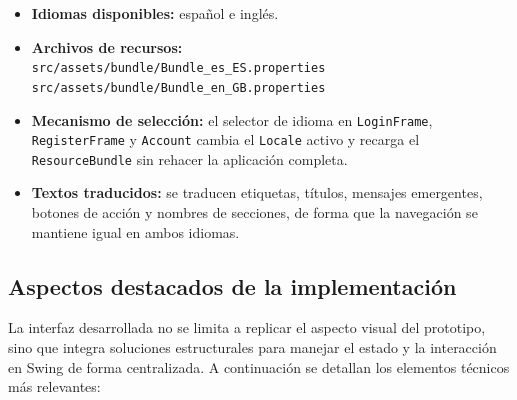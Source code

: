 \documentclass[12pt,a4paper]{article}
\begin{document}
\begin{itemize}
	\item \textbf{Idiomas disponibles:} español e inglés.
	\item \textbf{Archivos de recursos:}\\
	\texttt{src/assets/bundle/Bundle\_es\_ES.properties}\\
	\texttt{src/assets/bundle/Bundle\_en\_GB.properties}
	\item \textbf{Mecanismo de selección:} el selector de idioma en \texttt{LoginFrame}, \texttt{RegisterFrame} y \texttt{Account} cambia el \texttt{Locale} activo y recarga el \texttt{ResourceBundle} sin rehacer la aplicación completa.
	\item \textbf{Textos traducidos:} se traducen etiquetas, títulos, mensajes emergentes, botones de acción y nombres de secciones, de forma que la navegación se mantiene igual en ambos idiomas.
\end{itemize}

\subsection{Aspectos destacados de la implementación}

La interfaz desarrollada no se limita a replicar el aspecto visual del prototipo, sino que integra soluciones estructurales para manejar el estado y la interacción en Swing de forma centralizada. A continuación se detallan los elementos técnicos más relevantes:
\end{document}

